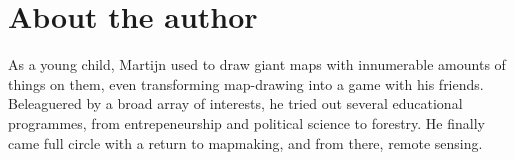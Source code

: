 \chapter{About the author}

As a young child, Martijn used to draw giant maps with innumerable amounts of things on them, even transforming map-drawing into a game with his friends. Beleaguered by a broad array of interests, he tried out several educational programmes, from entrepeneurship and political science to forestry. He finally came full circle with a return to mapmaking, and from there, remote sensing.


\nocite{*}
\printbibliography[heading=subbibliography, title={Peer-reviewed Journal Publications}, type=article]
\printbibliography[heading=subbibliography, title={Other Scientific Publications}, nottype=article]
	

